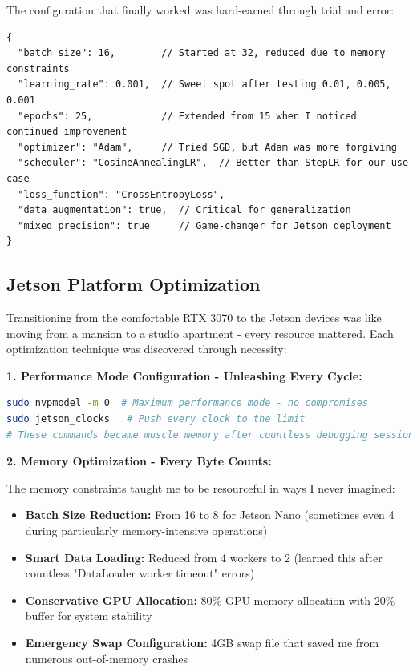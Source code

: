 \documentclass[12pt,a4paper]{report}
\begin{document}
The configuration that finally worked was hard-earned through trial and error:

\begin{lstlisting}[caption=Training Configuration - Refined Through Experience, label=lst:train_config]
{
  "batch_size": 16,        // Started at 32, reduced due to memory constraints  
  "learning_rate": 0.001,  // Sweet spot after testing 0.01, 0.005, 0.001
  "epochs": 25,            // Extended from 15 when I noticed continued improvement
  "optimizer": "Adam",     // Tried SGD, but Adam was more forgiving
  "scheduler": "CosineAnnealingLR",  // Better than StepLR for our use case
  "loss_function": "CrossEntropyLoss",
  "data_augmentation": true,  // Critical for generalization
  "mixed_precision": true     // Game-changer for Jetson deployment
}
\end{lstlisting}

\subsection{Jetson Platform Optimization}

Transitioning from the comfortable RTX 3070 to the Jetson devices was like moving from a mansion to a studio apartment - every resource mattered. Each optimization technique was discovered through necessity:

\textbf{1. Performance Mode Configuration - Unleashing Every Cycle:}

\begin{lstlisting}[caption=Jetson Performance Setup - Maximum Power Mode, label=lst:jetson_perf, language=bash]
sudo nvpmodel -m 0  # Maximum performance mode - no compromises
sudo jetson_clocks   # Push every clock to the limit
# These commands became muscle memory after countless debugging sessions
\end{lstlisting}

\textbf{2. Memory Optimization - Every Byte Counts:}

The memory constraints taught me to be resourceful in ways I never imagined:

\begin{itemize}
    \item \textbf{Batch Size Reduction:} From 16 to 8 for Jetson Nano (sometimes even 4 during particularly memory-intensive operations)
    \item \textbf{Smart Data Loading:} Reduced from 4 workers to 2 (learned this after countless "DataLoader worker timeout" errors)
    \item \textbf{Conservative GPU Allocation:} 80\% GPU memory allocation with 20\% buffer for system stability
    \item \textbf{Emergency Swap Configuration:} 4GB swap file that saved me from numerous out-of-memory crashes
\end{itemize}
\end{document}

